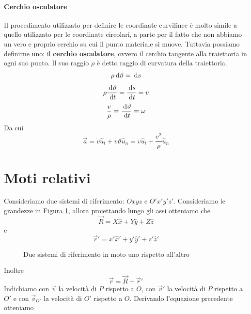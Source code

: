 \documentclass{article}
\theoremstyle{plain}
\begin{document}
\paragraph{Cerchio osculatore}
Il procedimento utilizzato per definire le coordinate curvilinee è molto simile a quello utilizzato per le coordinate circolari, a parte per il fatto che non abbiamo un vero e proprio cerchio su cui il punto materiale si muove. Tuttavia possiamo definirne uno: il    \textbf{cerchio osculatore}, ovvero il cerchio tangente alla traiettoria in ogni suo punto. Il suo raggio $\rho$ è detto raggio di curvatura della traiettoria.
\[\rho \:\text{d} \vartheta= \:\text{d} s\]
\[\rho \frac{\:\text{d} \vartheta}{\:\text{d} t}=\frac{\:\text{d} s}{\:\text{d} t}=v\]
\[\frac{v}{\rho}=\frac{\:\text{d} \vartheta }{\:\text{d} t}=\omega\]
Da cui 
\[\vec a =\dot v \hat u_t+v \dot \vartheta \hat u_n=\boxed{\dot v \hat u_t+\frac{v^2}{\rho} \hat u_n}\]

\section{Moti relativi}
Consideriamo due sistemi di riferimento: $Oxyz$ e $O'x'y'z'$. Consideriamo le grandezze in Figura \ref{fig: moti relativi}, allora proiettando lungo gli assi otteniamo che 
\[\vec R=X\hat x+Y\hat y+Z\hat z\]
e \[\vec r' = x'\hat x'+y'\hat y' +z'\hat z'\]
\begin{figure}[h]
    \centering
    \caption{Due sistemi di riferimento in moto uno rispetto all'altro}
    \label{fig: moti relativi}
\end{figure}

Inoltre 
\[\vec r= \vec R+\vec r'\]
Indichiamo con $\vec v$ la velocità di $P$ rispetto a $O$, con $\vec v'$ la velocità di $P$ rispetto a $O'$ e con $\vec v_{O'}$ la velocità di $O'$ rispetto a $O$. Derivando l'equazione precedente otteniamo
\end{document}
